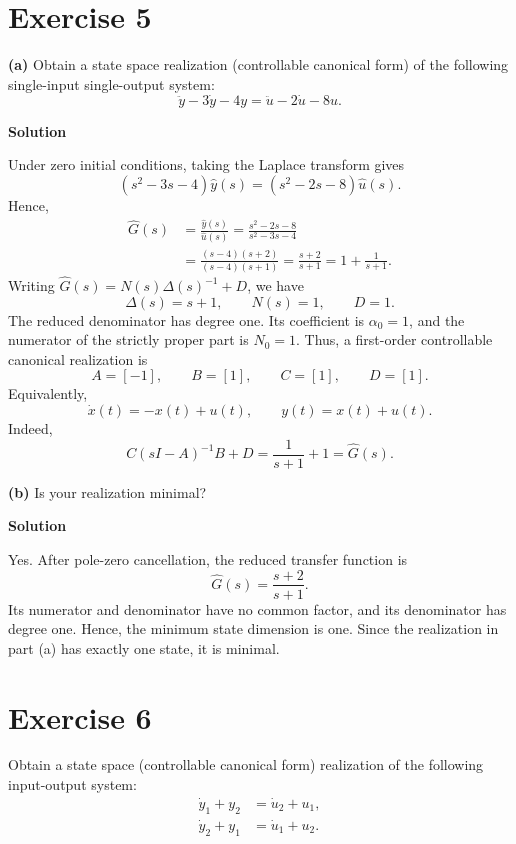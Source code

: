 \documentclass[12pt,a4paper]{article}
\begin{document}
\par\nopagebreak\vspace{3cm}

\Needspace{8cm}
\section*{Exercise 5}
\textbf{(a)} Obtain a state space realization (controllable canonical form) of the
following single-input single-output system:
\[
\ddot y-3\dot y-4y=\ddot u-2\dot u-8u.
\]

\textbf{Solution}

Under zero initial conditions, taking the Laplace transform gives
\[
(s^2-3s-4)\hat y(s)=(s^2-2s-8)\hat u(s).
\]
Hence,
\begin{align*}
\hat G(s)
&=\frac{\hat y(s)}{\hat u(s)}
 =\frac{s^2-2s-8}{s^2-3s-4}\\
&=\frac{(s-4)(s+2)}{(s-4)(s+1)}
 =\frac{s+2}{s+1}
 =1+\frac{1}{s+1}.
\end{align*}
Writing $\hat G(s)=N(s)\Delta(s)^{-1}+D$, we have
\[
\Delta(s)=s+1,\qquad N(s)=1,\qquad D=1.
\]
The reduced denominator has degree one. Its coefficient is $\alpha_0=1$,
and the numerator of the strictly proper part is $N_0=1$.
Thus, a first-order controllable canonical realization is
\[
\boxed{A=[-1],\qquad B=[1],\qquad C=[1],\qquad D=[1].}
\]
Equivalently,
\[
\boxed{\dot x(t)=-x(t)+u(t),\qquad y(t)=x(t)+u(t).}
\]
Indeed,
\[
C(sI-A)^{-1}B+D=\frac{1}{s+1}+1=\hat G(s).
\]

\Needspace{8cm}
\textbf{(b)} Is your realization minimal?

\textbf{Solution}

Yes. After pole-zero cancellation, the reduced transfer function is
\[
\hat G(s)=\frac{s+2}{s+1}.
\]
Its numerator and denominator have no common factor, and its denominator has
degree one. Hence, the minimum state dimension is one. Since the realization
in part (a) has exactly one state, it is minimal.

\Needspace{8cm}
\section*{Exercise 6}
Obtain a state space (controllable canonical form) realization of the following
input-output system:
\[
\begin{aligned}
\dot y_1+y_2 &= \dot u_2+u_1,\\
\dot y_2+y_1 &= \dot u_1+u_2.
\end{aligned}
\]
\end{document}
